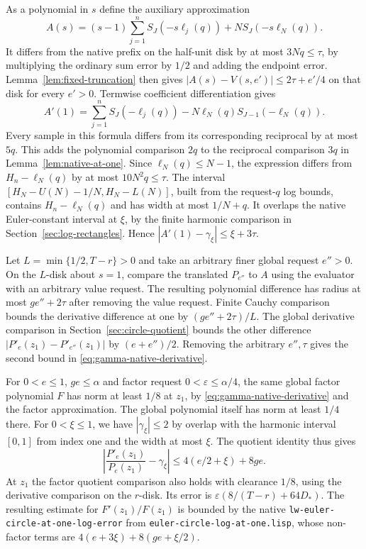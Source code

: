 \documentclass[11pt]{amsart}
\theoremstyle{definition}
\theoremstyle{remark}
\numberwithin{equation}{section}
\newcommand{\code}[1]{\nolinkurl{#1}}
\begin{document}
As a polynomial in $s$ define the auxiliary approximation
\[
A(s)=(s-1)\sum_{j=1}^n S_J(-s\ell_j(q))
                  +N S_J(-s\ell_N(q)).
\]
It differs from the native prefix on the half-unit disk
by at most $3Nq\le\tau$, by multiplying the ordinary
sum error by $1/2$ and adding the endpoint error.
Lemma~\ref{lem:fixed-truncation} then gives
$|A(s)-V(s,e')|\le2\tau+e'/4$ on that disk for
every $e'>0$.
Termwise coefficient differentiation gives
\[
 A'(1)=\sum_{j=1}^n S_J(-\ell_j(q))
          -N\ell_N(q)S_{J-1}(-\ell_N(q)).
\]
Every sample in this formula differs from its
corresponding reciprocal by at most $5q$. This adds the
polynomial comparison $2q$ to the reciprocal comparison
$3q$ in Lemma~\ref{lem:native-at-one}. Since
$\ell_N(q)\le N-1$, the expression differs from
$H_n-\ell_N(q)$ by at most $10N^2q\le\tau$.
The interval
$[H_N-U(N)-1/N,H_N-L(N)]$, built from the request-$q$
log bounds, contains $H_n-\ell_N(q)$ and has width
at most $1/N+q$. It overlaps the native Euler-constant
interval at $\xi$, by the finite harmonic comparison in
Section~\ref{sec:log-rectangles}. Hence
$|A'(1)-\gamma_\xi|\le \xi+3\tau$.

Let $L=\min\{1/2,T-r\}>0$ and take an arbitrary finer
global request $e''>0$. On the $L$-disk about $s=1$,
compare the translated $P_{e''}$ to $A$ using the
evaluator with an arbitrary value request. The resulting
polynomial difference has radius at most $ge''+2\tau$
after removing the value request. Finite Cauchy
comparison bounds the derivative difference at one by
$(ge''+2\tau)/L$. The global derivative comparison in
Section~\ref{sec:circle-quotient} bounds the other
difference $|P'_e(z_1)-P'_{e''}(z_1)|$ by
$(e+e'')/2$. Removing the arbitrary $e'',\tau$ gives
the second bound in \eqref{eq:gamma-native-derivative}.

For $0<e\le1$, $ge\le\alpha$ and factor request
$0<\varepsilon\le\alpha/4$, the same global factor
polynomial $F$ has norm at least $1/8$ at $z_1$, by
\eqref{eq:gamma-native-derivative} and the factor
approximation. The global polynomial itself has norm
at least $1/4$ there. For $0<\xi\le1$, we have
$|\gamma_\xi|\le2$ by overlap with the harmonic
interval $[0,1]$ from index one and the width at most
$\xi$. The quotient identity thus gives
\[
\left|\frac{P'_e(z_1)}{P_e(z_1)}-\gamma_\xi\right|
       \le 4(e/2+\xi)+8ge .
\]
At $z_1$ the factor quotient comparison also holds with
clearance $1/8$, using the derivative comparison on
the $r$-disk. Its error is
$\varepsilon(8/(T-r)+64D_*)$.
The resulting estimate for $F'(z_1)/F(z_1)$ is bounded
by the native \code{lw-euler-circle-at-one-log-error}
from \code{euler-circle-log-at-one.lisp}, whose
non-factor terms are $4(e+3\xi)+8(ge+\xi/2)$.
\end{document}
